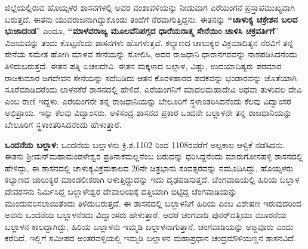ಜಿಲ್ಲೆಯಲ್ಲಿರುವ ಹೊಯ್ಸಳರ ಶಾಸನಗಳಲ್ಲಿ ಅವರ ವಂಶಾವಳಿಯನ್ನು ನೀಡುವಾಗ ಎರೆಯಂಗನ ಪ್ರಸ್ತಾಪ\break ಮುಖ್ಯವಾಗಿ ಬರುತ್ತದೆ. ಈತನು ಯುವರಾಜನಾಗಿದ್ದುಕೊಂಡು ತಂದೆಗೆ ನೆರವಾಗುತ್ತಿದ್ದನು. ಈತನನ್ನು \textbf{“ಚಾಳುಕ್ಯ ಚಕ್ರೇಶನ ಬಲದ ಭುಜಾದಂಡ}” ಎಂದೂ,\textbf{ “ಮಾಳವರಾಜ್ಯ ಮೂಲವೆನಿಪಗ್ಗದ ಧಾರೆಯನಾತ್ಮ ಸೇನೆಯಿಂ ಚಾಳಿಸಿ ಚಕ್ರವರ್ತಿಗೆ}” ವಿಜಯವನ್ನು ತಂದು ಕೊಟ್ಟನೆಂದು ಶಾಸನಗಳು ಹೊಗಳುತ್ತವೆ. ಕಲ್ಯಾಣದ ಚಾಲುಕ್ಯರ ವಿಕ್ರಮಾದಿತ್ಯನ ನೆರವಿಗೆ ತನ್ನ ಸೇನೆಯ ಸಮೇತ ಹೋಗಿ ಮಾಳವ ಸೇನೆಯನ್ನು ಸೋಲಿಸಿ, ಅದರ ರಾಜಧಾನಿ ಧಾರಾನಗರವನ್ನು ನಾಶಪಡಿಸಿದನೆಂದು ತಿಳಿದುಬರುತ್ತದೆ. ಈತನ ಪತ್ನಿ ಏಚಲದೇವಿ. ಈತನ ಮಕ್ಕಳಾದ ಬಲ್ಲಾಳ, ವಿಷ್ಣು, ಉದಯಾದಿತ್ಯರು ಪರಮಾರ ರಾಜಕುಮಾರ ಜಗದೇವನ ಸೇನೆಯನ್ನು ಸದೆಬಡಿದು ಆತನ ಕೊರಳಹಾರದ ಪದಕವನ್ನು ಭಂಡಾರವನ್ನು ಜೊತೆಯಾಗಿ ಸೂರೆಮಾಡಿದರೆಂದು ಲಾಳನಕೆರೆ ಶಾಸನದಲ್ಲಿ ಹೇಳಿದೆ. ಎರೆಯಂಗನಿಗೆ ಮಾದಲಮಹಾದೇವಿ ಅಥವಾ ತುಳುವಲ ದೇವಿ ಎಂಬ ರಾಣಿ ಇದ್ದಳು. ಎರೆಯಂಗನೇ ತನ್ನ ರಾಜಧಾನಿಯನ್ನು ಬೇಲೂರಿಗೆ ಸ್ಥಳಾಂತರಿಸಿದನೆಂದು ಕೆಲವು ವಿದ್ವಾಂಸರ ಅಭಿಪ್ರಾಯ. ಇನ್ನು ಕೆಲವು ವಿದ್ವಾಂಸರು, ಅಳಿಸಂದ್ರ ಶಾಸನದ ಪ್ರಕಾರ ಒಂದನೇ ಬಲ್ಲಾಳನೇ ತನ್ನ ರಾಜಧಾನಿಯನ್ನು ಬೇಲೂರಿಗೆ ಸ್ಥಳಾಂತರಿಸಿದನೆಂದು ಹೇಳುತ್ತಾರೆ.

\textbf{ಒಂದನೆಯ ಬಲ್ಲಾಳ:} ಒಂದನೆಯ ಬಲ್ಲಾಳನು ಕ್ರಿ.ಶ.1102 ರಿಂದ 1108ರವರೆಗೆ ಅಲ್ಪಕಾಲ ಆಳ್ವಿಕೆ ನಡೆಸಿದನು. ಈತನು ಶ‍್ರೀಮನ್​ಮಹಾಮಂಡಳೇಶ್ವರ ಪ್ರತಿನಾಕಮಲ್ಲನೆಂಬ ಬಿರುದನ್ನು ಧರಿಸಿದ್ದನೆಂದು ಮಾರುಗೋನಹಳ್ಳಿ ಶಾಸನದಲ್ಲಿ ಹೇಳಿದ್ದು, ಈ ಶಾಸನದಲ್ಲಿ ಚಾಳುಕ್ಯವಿಕ್ರಮ\-ಕಾಲದ 26ನೇ ಚಿತ್ರಭಾನು ಸಂವತ್ಸರವನ್ನು ನಮೂದಿಸಿದ್ದು, ಹೊಯ್ಸಳರು ಕಲ್ಯಾಣದ ಚಾಲುಕ್ಯರ ಮಾಂಡಲೀಕರಾಗಿ ಆಳುತ್ತಿದ್ದುದನ್ನು ಇದು ದೃಢಪಡಿಸುತ್ತದೆ. ಚೆಂಗವಾಡಿಯಲ್ಲಿ ಹಿರಿಯ ಬಲ್ಲಾಳ ದೇವರಸನು ನಿರ್ಮಿಸಿದ್ದ ಬಲ್ಲಾಳೇಶ್ವರ ದೇವಾಲಯಕ್ಕೆ ದತ್ತಿಯಾಗಿ ಬಿಟ್ಟಿದ್ದ ಚೆಂಗವಾಡಿಯನ್ನು ಮುಂದುವರಿಸಲಾಯಿತೆಂದು ತಿಳಿದುಬರುತ್ತದೆ. ಈ ಶಾಸನದಲ್ಲಿ ಬಲ್ಲಾಳನಿಗೆ ಹಿರಿಯ ಎಂಬ ವಿಶೇಷಣ ಇರುವುದರಿಂದ ಅವನು ಒಂದನೆಯ ಬಲ್ಲಾಳನೆಂದು ವಿದ್ವಾಂಸರು ಹೇಳುತ್ತಾರೆ. ಆದರೆ ಚಂಗವಾಡಿ ಪುನರ್​ ದತ್ತಿಯು ಮೂರನೆಯ ಬಲ್ಲಾಳನ ಕಾಲದ್ದಾಗಿದ್ದು, ಹಿರಿಯ ಬಲ್ಲಾಳನು ಇಮ್ಮಡಿ ಬಲ್ಲಾಳನಾಗುತ್ತಾನೆ. ಚಂಗವಾಡಿಯನ್ನು ಅಜ್ಜವೂರು ಎಂದು ಕರೆದಿದೆ. ಇಲ್ಲಿಗೆ ಸಮೀಪದ ಅಂತರವಳ್ಳಿಯಲ್ಲಿ ಇಮ್ಮಡಿ ಬಲ್ಲಾಳನ ಮಹಾಪ್ರಧಾನ ಚಂದ್ರಮೌಳಿಯಣ್ಣನ ಶಾಸನವಿದೆ.

